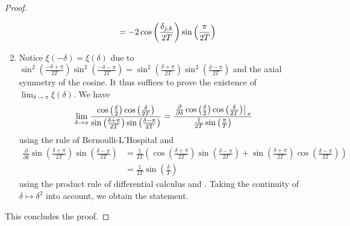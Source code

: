 \begin{proof}
\begin{enumerate}[label=(\roman*)]
\begin{enumerate}[label=(\arabic*), wide]
\begin{align}
                &= -2\cos\left(\frac{\delta_{j, k}}{2T}\right)\sin\left(\frac{\pi}{2T}\right)
            \end{align}
        \end{enumerate}
        \item \label{alpha_values_rewrite_2} Notice \(\xi(-\delta) = \xi(\delta)\) due to \(\sin^2\left(\frac{-\delta+\pi}{2T}\right)\sin^2\left(\frac{-\delta-\pi}{2T}\right) = \sin^2\left(\frac{\delta+\pi}{2T}\right)\sin^2\left(\frac{\delta-\pi}{2T}\right)\) and the axial symmetry of the cosine. It thus suffices to prove the existence of \(\lim_{\delta \to \pi} \xi(\delta)\). We have
        \begin{align}
            \lim_{\delta \to \pi} \frac{\cos\left(\frac{\delta}{2}\right)\cos\left(\frac{\delta}{2T}\right)}{\sin\left(\frac{\delta+\pi}{2T}\right)\sin\left(\frac{\delta-\pi}{2T}\right)} = \frac{\left.{\frac{\partial}{\partial \delta} \cos\left(\frac{\delta}{2}\right)\cos\left(\frac{\delta}{2T}\right)}\middle|\right._{\pi}}{\frac{1}{2T}\sin\left(\frac{\pi}{T}\right)}
        \end{align}
        using the rule of Bernoulli-L'Hospital \cite[pp. 150-151]{Koenigsberger2003} and
        \begin{align}
            \frac{\partial}{\partial \delta} \sin\left(\frac{\delta+\pi}{2T}\right)\sin\left(\frac{\delta-\pi}{2T}\right) &= \frac{1}{2T}\left(\cos\left(\frac{\delta+\pi}{2T}\right)\sin\left(\frac{\delta-\pi}{2T}\right)+\sin\left(\frac{\delta+\pi}{2T}\right)\cos\left(\frac{\delta-\pi}{2T}\right)\right)\\
            &= \frac{1}{2T}\sin\left(\frac{\delta}{T}\right)
        \end{align}
        using the product rule of differential calculus and . Taking the continuity of \(\delta \mapsto \delta^2\) into account, we obtain the statement.
    \end{enumerate}

    This concludes the proof.
\end{proof}

